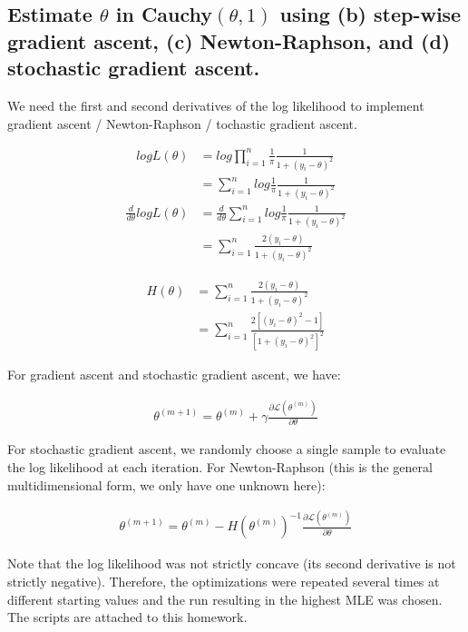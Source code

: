 \documentclass[11pt]{article}
\begin{document}
\subsection*{Estimate $\theta$ in Cauchy$(\theta, 1)$ using (b) step-wise gradient ascent, (c) Newton-Raphson, and (d) stochastic gradient ascent. }

We need the first and second derivatives of the log likelihood to implement gradient ascent / Newton-Raphson / tochastic gradient ascent. 

\begin{align*} log L(\theta) &= log \prod_{i=1}^n \frac{1}{\pi}\frac{1}{1+(y_i-\theta)^2} \\
&= \sum_{i=1}^n log \frac{1}{\pi}\frac{1}{1+(y_i-\theta)^2} \end{align*}
\begin{align*} \frac{d}{d\theta}log L(\theta) &= \frac{d}{d\theta}\sum_{i=1}^n log \frac{1}{\pi}\frac{1}{1+(y_i-\theta)^2} \\
&=  \sum_{i=1}^n   \frac{2(y_i-\theta)}{1+(y_i-\theta)^2}\end{align*}

\begin{align*} H(\theta) &=\sum_{i=1}^n   \frac{2(y_i-\theta)}{1+(y_i-\theta)^2} \\
&=  \sum_{i=1}^n   \frac{2[(y_i-\theta)^2-1]}{[1+(y_i-\theta)^2]^2} \end{align*}

For gradient ascent and stochastic gradient ascent, we have:

\begin{align*}
    \theta^{(m+1)} = \theta^{(m)} + \gamma \frac{\partial \mathcal{L}(\theta^{(m)})}{\partial \theta}
\end{align*}

For stochastic gradient ascent, we randomly choose a single sample to evaluate the log likelihood at each iteration. For Newton-Raphson (this is the general multidimensional form, we only have one unknown here):

\begin{align*}
    \theta^{(m+1)} = \theta^{(m)} - H(\theta^{(m)})^{-1} \frac{\partial \mathcal{L}(\theta^{(m)})}{\partial \theta}
\end{align*}

Note that the log likelihood was not strictly concave (its second derivative is not strictly negative). Therefore, the optimizations were repeated several times at different starting values and the run resulting in the highest MLE was chosen. The scripts are attached to this homework.
\end{document}
